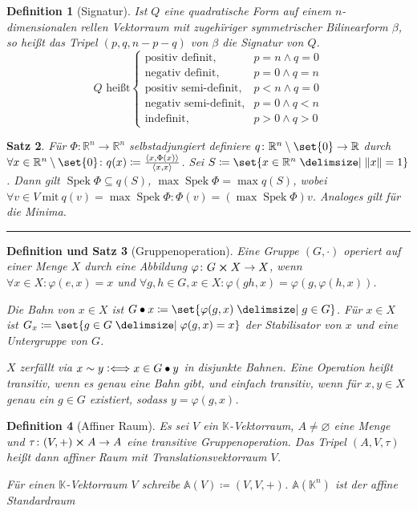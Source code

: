 \documentclass[a4paper]{article}
\newcounter{Sec}
\theoremstyle{marginbreak}
\newtheorem{definition}{Definition}[Sec]
\newtheorem{satz}[definition]{Satz}
\newtheorem{defsatz}[definition]{Definition und Satz}
\DeclareMathOperator{\Spek}{Spek}
\newcommand{\sep}{%
	\rule{\textwidth}{0.3pt}%
	\stepcounter{Sec}%
	}
\newcommand\defiff{\mathrel{\vcentcolon\Longleftrightarrow}}
\newcommand\scp[1]{\left\langle#1\right\rangle}
\begin{document}
	\begin{definition}[Signatur]
		Ist $Q$ eine quadratische Form auf einem $n$-dimensionalen rellen Vektorraum mit
		zugehïriger symmetrischer Bilinearform $\beta$, so heißt das Tripel $(p, q, n - p - q)$
		von $\beta$ die Signatur von $Q$.
		\begin{equation*}
			Q\text{ heißt}
			\begin{cases}
				\text{positiv definit}, &p = n \wedge q = 0\\
				\text{negativ definit}, &p = 0 \wedge q = n\\
				\text{positiv semi-definit}, &p < n\wedge q = 0\\
				\text{negativ semi-definit}, &p = 0\wedge q < n\\
				\text{indefinit}, &p>0\wedge q>0
			\end{cases}
		\end{equation*}
	\end{definition}
	\begin{satz}
		Für $\Phi\colon\mathbb{R}^n\to\mathbb{R}^n$ selbstadjungiert definiere
		$q\colon\mathbb{R}^n\setminus\set{0}\to\mathbb{R}$ durch $\forall x\in\mathbb{R}^n\setminus\set{0}\colon
		q(x)\coloneqq\frac{\scp{x,\Phi(x)}}{\scp{x, x}}$. Sei $S\coloneqq\set{x\in\mathbb{R}^n\given\norm{x}=1}$.
		Dann gilt $\Spek\Phi\subseteq q(S)$,
		$\max\Spek\Phi=\max q(S)$, wobei $\forall v\in V\ \text{mit}\ q(v)=\max\Spek\Phi\colon\Phi(v)=(\max\Spek\Phi)v$.
		Analoges gilt für die Minima.
	\end{satz}
	\sep
	\begin{defsatz}[Gruppenoperation]
		Eine Gruppe $(G,\cdot)$ operiert auf einer Menge $X$ durch eine Abbildung
		$\varphi\colon G\cross X\to X$, wenn $\forall x\in X\colon\varphi(e, x)=x$ und
		$\forall g, h\in G, x\in X\colon\varphi(gh, x) = \varphi(g,\varphi(h, x))$.

		Die Bahn von $x\in X$ ist $G\bullet x\coloneqq\set{\varphi(g, x)\given g\in G}$. Für $x\in X$
		ist $G_x\coloneqq\set{g\in G\given\varphi(g, x)=x}$ der Stabilisator von $x$ und
		eine Untergruppe von $G$.

		$X$ zerfällt via $x\sim y\defiff x\in G\bullet y$ in disjunkte Bahnen. Eine
		Operation heißt transitiv, wenn es genau eine Bahn gibt, und einfach transitiv, wenn
		für $x, y\in X$ genau ein $g\in G$ existiert, sodass $y=\varphi(g, x)$.
	\end{defsatz}
	\begin{definition}[Affiner Raum]
		Es sei $V$ ein $\mathbb{K}$-Vektorraum, $A\neq\varnothing$ eine Menge und
		$\tau\colon (V,+)\cross A\to A$ eine transitive Gruppenoperation. Das Tripel
		$(A, V, \tau)$ heißt dann affiner Raum mit Translationsvektorraum $V$.

		Für einen $\mathbb{K}$-Vektorraum $V$ schreibe $\mathbb{A}(V)\coloneqq(V, V, +)$.
		$\mathbb{A}(\mathbb{K}^n)$ ist der affine Standardraum
	\end{definition}
\end{document}
